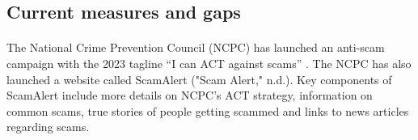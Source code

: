 \documentclass[a4paper]{article}
\begin{document}
\begin{multicols}{2}
    \subsection{Current measures and gaps}
    \paragraph{} The National Crime Prevention Council (NCPC) has launched an
	anti-scam campaign with the 2023 tagline ``I can ACT against
    scams'' \parencite{Sun.2023}. The NCPC has also launched
	a website called ScamAlert ("Scam Alert," n.d.). Key components
	of ScamAlert include more details on NCPC’s ACT strategy,
	information on common scams, true stories of people getting
	scammed and links to news articles regarding scams.



\end{multicols}

\newpage

\printbibliography[heading=bibintoc,title={References}]

\newpage


\begin{appendices}
\end{appendices}


\end{document}

